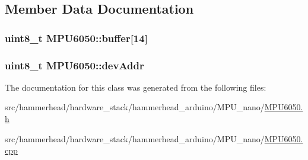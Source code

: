 \subsection{Member Data Documentation}
\subsubsection[{\texorpdfstring{buffer}{buffer}}]{\setlength{\rightskip}{0pt plus 5cm}uint8\+\_\+t M\+P\+U6050\+::buffer\mbox{[}14\mbox{]}\hspace{0.3cm}{\ttfamily [private]}}\hypertarget{classMPU6050_ad2000cad671bb7b293e26f2d463d4cea}{}\label{classMPU6050_ad2000cad671bb7b293e26f2d463d4cea}
\subsubsection[{\texorpdfstring{dev\+Addr}{devAddr}}]{\setlength{\rightskip}{0pt plus 5cm}uint8\+\_\+t M\+P\+U6050\+::dev\+Addr\hspace{0.3cm}{\ttfamily [private]}}\hypertarget{classMPU6050_ad248bbf6e9da395ab67f7049b50ae474}{}\label{classMPU6050_ad248bbf6e9da395ab67f7049b50ae474}


The documentation for this class was generated from the following files\+:\begin{DoxyCompactItemize}
\item 
src/hammerhead/hardware\+\_\+stack/hammerhead\+\_\+arduino/\+M\+P\+U\+\_\+nano/\hyperlink{MPU6050_8h}{M\+P\+U6050.\+h}\item 
src/hammerhead/hardware\+\_\+stack/hammerhead\+\_\+arduino/\+M\+P\+U\+\_\+nano/\hyperlink{MPU6050_8cpp}{M\+P\+U6050.\+cpp}\end{DoxyCompactItemize}
